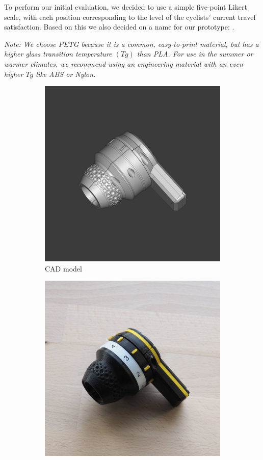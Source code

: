 To perform our initial evaluation, we decided to use a simple five-point Likert scale, with each position corresponding to the level of the cyclists' current travel satisfaction.
Based on this we also decided on a name for our prototype: \likertshift.

\bigbreak\noindent
\textit{%
    Note: We choose PETG because it is a common, easy-to-print material, but has a higher glass transition temperature $(Tg)$ than PLA. For use in the summer or warmer climates, we recommend using an engineering material with an even higher $Tg$ like ABS or Nylon.
}

\begin{figure}[!htb]
    \centering
    \begin{subfigure}{.3333\textwidth}
        \centering
        \includegraphics[width=.9\linewidth]{images/likertshift_freecad.jpg}
        \caption{CAD model}
    \end{subfigure}%
    \begin{subfigure}{.3333\textwidth}
        \centering
        \includegraphics[width=.9\linewidth]{images/likertshift_assembled.jpg}

\end{subfigure}
\end{figure}
